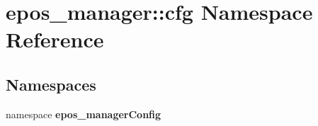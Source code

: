 \section{epos\-\_\-manager\-:\-:cfg \-Namespace \-Reference}
\label{namespaceepos__manager_1_1cfg}
\subsection*{\-Namespaces}
\begin{DoxyCompactItemize}
\item 
namespace {\bf epos\-\_\-manager\-Config}
\end{DoxyCompactItemize}

